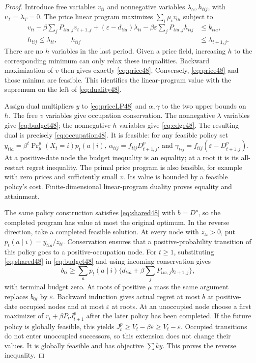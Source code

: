 \begin{proof}
Introduce free variables $v_{ti}$ and nonnegative variables $\lambda_{ti},h_{tij}$, with $v_T=\lambda_T=0$. The price linear program maximizes $\sum_i\mu_i v_{0i}$ subject to
\begin{align}
 v_{ti}-\beta\sum_jP_{tia,j}v_{t+1,j}
 +(\varepsilon-d_{tia})\lambda_{ti}
 -\beta\varepsilon\sum_jP_{tia,j}h_{tij}&\le k_{tia},\label{eq:priceLP48}\\
 h_{tij}\le\lambda_{ti},\qquad h_{tij}&\le\lambda_{t+1,j}.\nonumber
\end{align}
There are no $h$ variables in the last period. Given a price field, increasing $h$ to the corresponding minimum can only relax these inequalities. Backward maximization of $v$ then gives exactly \eqref{eq:price48}. Conversely, \eqref{eq:price48} and those minima are feasible. This identifies the linear-program value with the supremum on the left of \eqref{eq:duality48}.

Assign dual multipliers $y$ to \eqref{eq:priceLP48} and $\alpha,\gamma$ to the two upper bounds on $h$. The free $v$ variables give occupation conservation. The nonnegative $\lambda$ variables give \eqref{eq:budget48}; the nonnegative $h$ variables give \eqref{eq:edge48}. The resulting dual is precisely \eqref{eq:occupation48}. It is feasible: for any feasible policy set $y_{tia}=\beta^t\Pr_\mu^p(X_t=i)p_t(a\mid i)$, $\alpha_{tij}=f_{tij}D_{t+1,j}^p$, and $\gamma_{tij}=f_{tij}(\varepsilon-D_{t+1,j}^p)$. At a positive-date node the budget inequality is an equality; at a root it is its all-restart regret inequality. The primal price program is also feasible, for example with zero prices and sufficiently small $v$. Its value is bounded by a feasible policy's cost. Finite-dimensional linear-program duality proves equality and attainment.

The same policy construction satisfies \eqref{eq:shared48} with $b=D^p$, so the completed program has value at most the original optimum. In the reverse direction, take a completed feasible solution. At every node with $z_{ti}>0$, put $p_t(a\mid i)=y_{tia}/z_{ti}$. Conservation ensures that a positive-probability transition of this policy goes to a positive-occupation node. For $t\ge1$, substituting \eqref{eq:shared48} in \eqref{eq:budget48} and using incoming conservation gives
\[
 b_{ti}\ge\sum_a p_t(a\mid i)\{d_{tia}+\beta\sum_jP_{tia,j}b_{t+1,j}\},
\]
with terminal budget zero. At roots of positive $\mu$ mass the same argument replaces $b_{0i}$ by $\varepsilon$. Backward induction gives actual regret at most $b$ at positive-date occupied nodes and at most $\varepsilon$ at roots. At an unoccupied node choose a first maximizer of $r_t+\beta P_tJ_{t+1}^p$ after the later policy has been completed. If the future policy is globally feasible, this yields $J_t^p\ge V_t-\beta\varepsilon\ge V_t-\varepsilon$. Occupied transitions do not enter unoccupied successors, so this extension does not change their values. It is globally feasible and has objective $\sum ky$. This proves the reverse inequality.
\end{proof}

